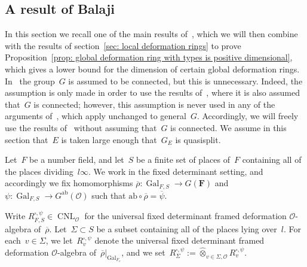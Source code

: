 \documentclass{amsart}
\renewcommand{\mathbb}{\mathbf}
\newcommand{\CNL}{\operatorname{CNL}}
\newcommand{\psibar}{\overline{\psi}}
\newcommand\Gder{G^{\mathrm{der}}}
\newcommand\Gab{G^{\mathrm{ab}}}
\def\wotimes {\widehat{\otimes}}
\theoremstyle{definition}
\theoremstyle{remark}
\newcommand{\mar}[1]{}
\newcommand{\mar}[1]{\marginpar{\raggedright\tiny squirrel #1}}
\newcommand{\F}{\FF}
\newcommand{\FF}{{\mathbb F}}
\newcommand{\cO}{{\mathcal O}}
\DeclareMathOperator{\Gal}{Gal}
\newcommand{\ab}{\mathrm{ab}}
\newcommand{\rhobar}{\overline{\rho}}
\newcommand{\into}{\hookrightarrow}
\begin{document}
\subsection{A result of Balaji}\label{subsec: Balaji}In this section
we recall one of the main results of~\cite{MR3152673}, which we will then
combine with the results of section~\ref{sec: local deformation
  rings} to prove Proposition~\ref{prop: global deformation ring with types is positive
    dimensional}, which gives a lower bound for the dimension
of certain global deformation rings. In~\cite[\S 4.2]{MR3152673} the
group~$G$ is assumed to be connected, but this is unnecessary. Indeed, the
assumption is only made in order to use the results of~\cite[\S
5]{MR1643682}, where it is also assumed that~$G$ is connected;
however, this assumption is never used in any of the arguments
of~\cite[\S 5]{MR1643682}, which apply unchanged to
general~$G$. Accordingly, we will freely use the results of~\cite[\S
4.2]{MR3152673} without assuming that~$G$ is connected. We assume in
this section that~$E$  is taken large enough that~$G_E$ is quasisplit.

Let~$F$ be a number field, and let~$S$ be a finite set of places of~$F$
containing all of the places dividing~$l\infty$. We work in the fixed determinant setting, and accordingly we
fix homomorphisms $\rhobar:\Gal_{F,S}\to G(\F)$
and~$\psi:\Gal_{F,S}\to\Gab(\cO)$ such that $\ab\circ\rhobar=\psibar$.



Write
$R^{\square,\psi}_{F,S}\in\CNL_\cO$ for the universal
fixed determinant framed deformation $\cO$-algebra
of~$\rhobar$. 
Let~$\Sigma\subset S$ be a subset containing all of the places lying
over~$l$. For each~$v\in\Sigma$, we let~$R_v^{\square,\psi}$ denote
the %
universal fixed determinant framed deformation $\cO$-algebra
of~$\rhobar|_{\Gal_{F_v}}$, and we set~$R_\Sigma^{\square,\psi}:=\wotimes_{v\in\Sigma,\cO}
R_v^{\square,\psi}$.
\end{document}

